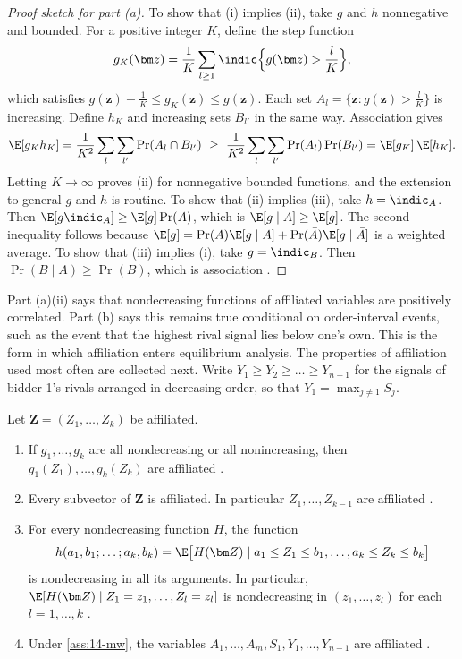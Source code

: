 \begin{proof}[Proof sketch for part (a)]
To show that (i) implies (ii), take $g$ and $h$ nonnegative and bounded. For a positive integer $K$, define
the step function
\[
g_K(\bm z)=\frac{1}{K}\sum_{l\ge 1}\indic\Bigl\{g(\bm z)>\frac{l}{K}\Bigr\},
\]
which satisfies $g(\bm z)-\frac{1}{K}\le g_K(\bm z)\le g(\bm z)$. Each set $A_l=\{\bm z:g(\bm z)>\frac{l}{K}\}$ is
increasing. Define $h_K$ and increasing sets $B_{l'}$ in the same way. Association gives
\[
\E[g_Kh_K]=\frac{1}{K^2}\sum_{l}\sum_{l'}\Pr(A_l\cap B_{l'})\ \ge\
\frac{1}{K^2}\sum_{l}\sum_{l'}\Pr(A_l)\Pr(B_{l'})=\E[g_K]\,\E[h_K].
\]
Letting $K\to\infty$ proves (ii) for nonnegative bounded functions, and the extension to general $g$ and $h$ is
routine. To show that (ii) implies (iii), take $h=\indic_A$. Then $\E[g\indic_A]\ge\E[g]\Pr(A)$, which is
$\E[g\mid A]\ge\E[g]$. The second inequality follows because $\E[g]=\Pr(A)\E[g\mid A]+\Pr(\bar A)\E[g\mid \bar
A]$ is a weighted average. To show that (iii) implies (i), take $g=\indic_B$. Then $\Pr(B\mid A)\ge\Pr(B)$,
which is association \citep[p.~1119]{MilgromWeber1982}.
\end{proof}

Part (a)(ii) says that nondecreasing functions of affiliated variables are positively correlated. Part (b)
says this remains true conditional on order-interval events, such as the event that the highest rival
signal lies below one's own. This is the form in which affiliation enters equilibrium analysis. The
properties of affiliation used most often are collected next. Write $Y_1\ge Y_2\ge\dots\ge Y_{n-1}$ for the
signals of bidder 1's rivals arranged in decreasing order, so that $Y_1=\max_{j\neq 1}S_j$.

\begin{proposition}[Properties of affiliated variables]\label{prop:14-affil-props}
Let $\bm Z=(Z_1,\dots,Z_k)$ be affiliated.
\begin{enumerate}[label=(\roman*)]
  \item If $g_1,\dots,g_k$ are all nondecreasing or all nonincreasing, then $g_1(Z_1),\dots,g_k(Z_k)$ are
  affiliated \citep[Theorem~3]{MilgromWeber1982}.
  \item Every subvector of $\bm Z$ is affiliated. In particular $Z_1,\dots,Z_{k-1}$ are affiliated
  \citep[Theorem~4]{MilgromWeber1982}.
  \item For every nondecreasing function $H$, the function
  \[
  h(a_1,b_1;\dots;a_k,b_k)=\E\bigl[H(\bm Z)\mid a_1\le Z_1\le b_1,\dots,a_k\le Z_k\le b_k\bigr]
  \]
  is nondecreasing in all its arguments. In particular, $\E[H(\bm Z)\mid Z_1=z_1,\dots,Z_l=z_l]$ is
  nondecreasing in $(z_1,\dots,z_l)$ for each $l=1,\dots,k$ \citep[Theorem~5]{MilgromWeber1982}.
  \item Under \cref{ass:14-mw}, the variables $A_1,\dots,A_m,S_1,Y_1,\dots,Y_{n-1}$ are affiliated
  \citep[Theorem~2]{MilgromWeber1982}.
\end{enumerate}
\end{proposition}

